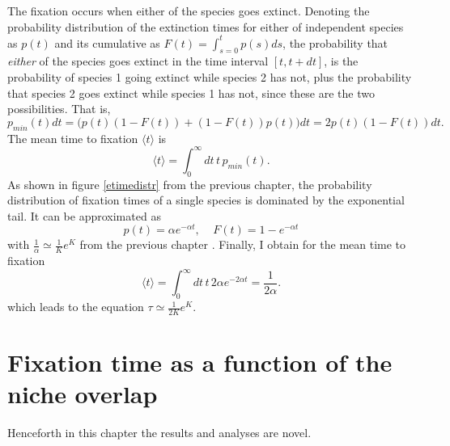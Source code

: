 The fixation occurs when either of the species goes extinct. 
Denoting the probability distribution of the extinction times for either of independent species as $p(t)$ and its cumulative as $F(t)=\int_{s=0}^t p(s)ds$, the probability that \emph{either} of the species goes extinct in the time interval $[t,t+dt]$, is the probability of species 1 going extinct while species 2 has not, plus the probability that species 2 goes extinct while species 1 has not, since these are the two possibilities. 
That is,
\begin{equation}
p_{min}(t)dt = \bigg(p(t)\left(1-F(t)\right)+\left(1-F(t)\right)p(t)\bigg)dt = 2p(t)\left(1-F(t)\right)dt.
\end{equation}
The mean time to fixation $\langle t\rangle$ is 
\begin{equation}
\langle t\rangle = \int_0^\infty dt\, t\, p_{min}(t).
\end{equation}
As shown in figure \ref{etimedistr} from the previous chapter, the probability distribution of fixation times of a single species is dominated by the exponential tail. %
It can be approximated as
\begin{equation}
p(t) = \alpha e^{-\alpha t},\;\;\;\;  F(t) = 1 - e^{-\alpha t}
\end{equation}
with $\frac{1}{\alpha}\simeq \frac{1}{K}e^K$ from the previous chapter \cite{Lande1993,Lambert2005}. 
Finally, I obtain for the mean time to fixation
\begin{equation}
\langle t\rangle = \int_0^\infty dt\, t\, 2\alpha e^{-2\alpha t} = \frac{1}{2\alpha}. 
 \label{indietime}
\end{equation}
which leads to the equation $\tau \simeq \frac{1}{2K} e^K$. 


\section{Fixation time as a function of the niche overlap}
Henceforth in this chapter the results and analyses are novel. 

